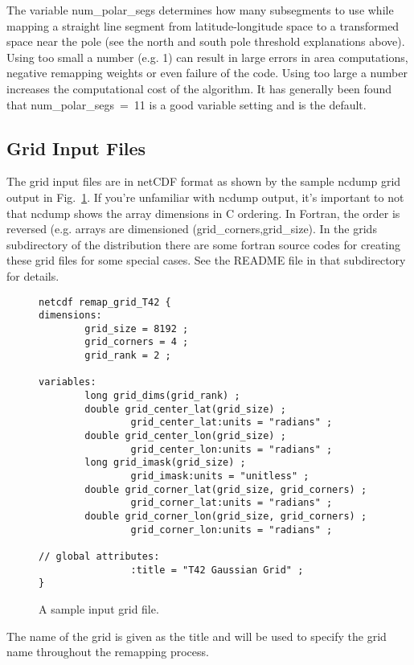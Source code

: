 \documentclass[12pt]{report}
\begin{document}
The variable num\_polar\_segs determines how many 
subsegments to use while mapping a straight line 
segment from latitude-longitude space to a transformed 
space near the pole (see the north and south pole
threshold explanations above). Using too small a 
number (e.g. 1) can result in large errors in area 
computations, negative remapping weights or even 
failure of the code. Using too large a number
increases the computational cost of the algorithm. 
It has generally been found that num\_polar\_segs~=~11 
is a good variable setting and is the default.


\subsection{Grid Input Files}

The grid input files are in netCDF format as shown
by the sample ncdump grid output in Fig.~\ref{fig:ncgrid}.
If you're unfamiliar with ncdump output, it's important to
not that ncdump shows the array dimensions in C ordering.
In Fortran, the order is reversed (e.g. arrays are
dimensioned (grid\_corners,grid\_size).
In the grids subdirectory of the distribution there
are some fortran source codes for creating these
grid files for some special cases.  See the README
file in that subdirectory for details.

\begin{figure}
\caption{A sample input grid file. \label{fig:ncgrid}}
\begin{verbatim}
netcdf remap_grid_T42 {
dimensions:
        grid_size = 8192 ;
        grid_corners = 4 ;
        grid_rank = 2 ;

variables:
        long grid_dims(grid_rank) ;
        double grid_center_lat(grid_size) ;
                grid_center_lat:units = "radians" ;
        double grid_center_lon(grid_size) ;
                grid_center_lon:units = "radians" ;
        long grid_imask(grid_size) ;
                grid_imask:units = "unitless" ;
        double grid_corner_lat(grid_size, grid_corners) ;
                grid_corner_lat:units = "radians" ;
        double grid_corner_lon(grid_size, grid_corners) ;
                grid_corner_lon:units = "radians" ;

// global attributes:
                :title = "T42 Gaussian Grid" ;
}
\end{verbatim}
\end{figure}

The name of the grid is given as the title and will be used
to specify the grid name throughout the remapping process.
\end{document}
